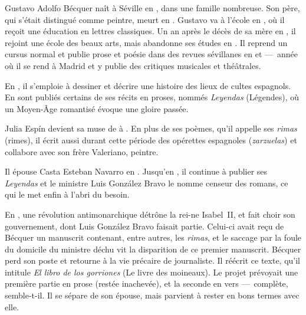 






Gustavo Adolfo Bécquer naît à Séville en , dans une
famille nombreuse. Son père, qui s'était distingué comme peintre,
meurt en . Gustavo va à l'école en
, où il reçoit une éducation en lettres
classiques. Un an après le décès de sa mère en , il
rejoint une école des beaux arts, mais abandonne ses études en
. Il reprend un cursus normal et publie prose et
poésie dans des revues sévillanes en  et
 ---~année où il se rend à Madrid et y publie des
critiques musicales et théâtrales.

En , il s'emploie à dessiner et décrire une
histoire des lieux de cultes espagnols. En  sont
publiés certains de ses récits en proses, nommés \emph{Leyendas}
(Légendes), où un Moyen-Âge romantisé évoque une gloire passée.

Julia Espín devient sa muse de 
à . En plus de ses poèmes, qu'il appelle
ses \emph{rimas} (rimes), il écrit aussi durant cette période des
opérettes espagnoles (\emph{zarzuelas}) et collabore avec son frère
Valeriano, peintre.

Il épouse Casta Esteban Navarro en
. Jusqu'en , il continue à
publier ses \emph{Leyendas} et le ministre Luis González Bravo le
nomme censeur des romans, ce qui le met enfin à l'abri du besoin.

En , une révolution antimonarchique détrône la
rei-ne Isabel~II, et fait choir son gouvernement, dont Luis González
Bravo faisait partie. Celui-ci avait reçu de Bécquer un manuscrit
contenant, entre autres, les \emph{rimas}, et le saccage par la foule
du domicile du ministre déchu vit la disparition de ce premier
manuscrit. Bécquer perd son poste et retourne à la vie précaire de
journaliste. Il réécrit ce texte, qu'il intitule \emph{El libro de los
gorriones} (Le livre des moineaux). Le projet prévoyait une première
partie en prose (restée inachevée), et la seconde en vers
---~complète, semble-t-il. Il se sépare de son épouse, mais parvient à
rester en bons termes avec elle.

